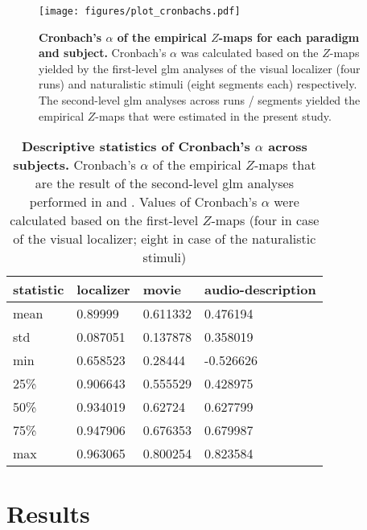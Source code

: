 \begin{figure*}[tbp] \centering
    \texttt{[image: figures/plot\_cronbachs.pdf]}
    \caption{\textbf{Cronbach's $\alpha$ of the empirical $Z$-maps for each
    paradigm and subject.}
    Cronbach's $\alpha$ was calculated based on the $Z$-maps yielded by the
    first-level \ac{glm} analyses of the visual localizer
    \citep{sengupta2016extension} (four runs) and naturalistic stimuli
    \citep{haeusler2022processing} (eight segments each) respectively.
    The second-level \ac{glm} analyses across runs / segments yielded the
    empirical $Z$-maps that were estimated in the present study.
    }
    \label{fig:cronbachs}
\end{figure*}


\begin{table*}[btp]
\centering
    \caption{
    \textbf{Descriptive statistics of Cronbach's $\alpha$ across subjects.}
    Cronbach's $\alpha$ of the empirical $Z$-maps that are the result of the
    second-level \ac{glm} analyses performed in
    \citet{sengupta2016extension} and \citet{haeusler2022processing}. Values of
    Cronbach's $\alpha$ were calculated based on the first-level $Z$-maps (four
    in case of the visual localizer; eight in case of the naturalistic stimuli)}
\label{tab:cronbachs}
\begin{tabular}{llll}
    \toprule
    \textbf{statistic} & \textbf{localizer} & \textbf{movie} & \textbf{audio-description} \\
    \midrule
    mean & 0.89999 & 0.611332 & 0.476194 \tabularnewline
    std & 0.087051 & 0.137878 & 0.358019 \tabularnewline
    min & 0.658523 & 0.28444 & -0.526626 \tabularnewline
    25\% & 0.906643 & 0.555529 & 0.428975 \tabularnewline
    50\% & 0.934019 & 0.62724 & 0.627799 \tabularnewline
    75\% & 0.947906 & 0.676353 & 0.679987 \tabularnewline
    max & 0.963065 & 0.800254 & 0.823584 \tabularnewline
    \bottomrule
\end{tabular}
\end{table*}



\section{Results}


\begin{comment}

``Because the localizer task comprises several scanning runs, we calculated the
reliability of the localizer across runs with Cronbach's $\alpha$ to provide an
estimate of the noise ceiling for these correlations'' \citep{jiahui2022cross}.

\end{comment}


